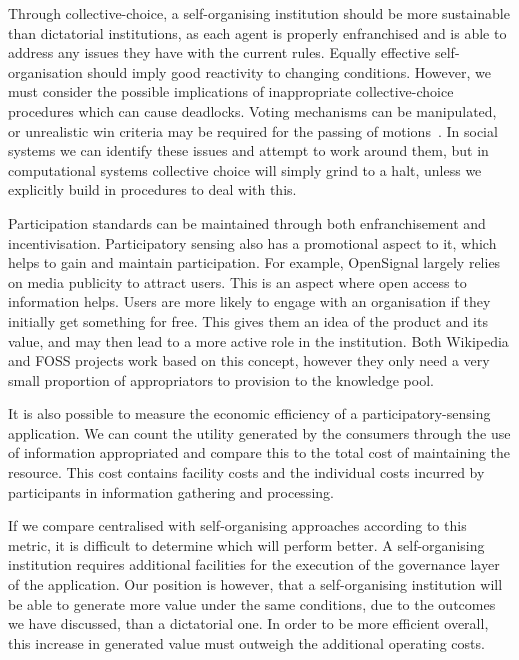 Through collective-choice, a self-organising institution should be more sustainable than dictatorial institutions, as each agent is properly enfranchised and is able to address any issues they have with the current rules. 
Equally effective self-organisation should imply good reactivity to changing conditions. 
However, we must consider the possible implications of inappropriate collective-choice procedures which can cause deadlocks. 
Voting mechanisms can be manipulated, or unrealistic win criteria may be required for the passing of motions~\citep{Conitzer2007,Pitt2011b}. 
In social systems we can identify these issues and attempt to work around them, but in computational systems collective choice will simply grind to a halt, 
unless we explicitly build in procedures to deal with this.

Participation standards can be maintained through both enfranchisement and incentivisation. 
Participatory sensing also has a promotional aspect to it, which helps to gain and maintain participation. 
For example, OpenSignal largely relies on media publicity to attract users. 
This is an aspect where open access to information helps. 
Users are more likely to engage with an organisation if they initially get something for free. 
This gives them an idea of the product and its value, and may then lead to a more active role in the institution. 
Both Wikipedia and \ac{FOSS} projects work based on this concept, however they only need a very small proportion of appropriators to provision to the knowledge pool. 

It is also possible to measure the economic efficiency of a participatory-sensing application. We can count the utility generated by the consumers through the use of information appropriated and compare this to the total cost of maintaining the resource. This cost contains facility costs and the individual costs incurred by participants in information gathering and processing.

If we compare centralised with self-organising approaches according to this metric, it is difficult to determine which will perform better. 
A self-organising institution requires additional facilities for the execution of the governance layer of the application. 
Our position is however, that a self-organising institution will be able to generate more value under the same conditions, due to the outcomes we have discussed, than a dictatorial one. 
In order to be more efficient overall, this increase in generated value must outweigh the additional operating costs.

